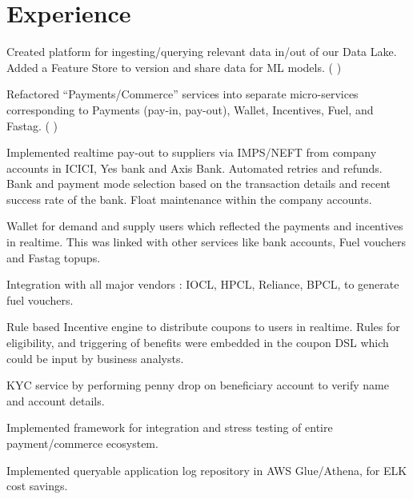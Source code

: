 \documentclass[]{deedy-resume-openfont}
\begin{document}
    
%
%
%
%
\section{Experience}
\hfill {}
\begin{tightemize}
	\item Created platform for ingesting/querying relevant data in/out of our Data Lake. Added a Feature Store to version and share data for ML models.\newline
    (
        {}
    )
	\item Refactored “Payments/Commerce” services into separate micro-services corresponding to Payments (pay-in, pay-out), Wallet, Incentives, Fuel, and Fastag.\newline
    (
        {}
    )
	\item Implemented realtime pay-out to suppliers via IMPS/NEFT from company accounts in ICICI, Yes bank and Axis Bank. Automated retries and refunds. Bank and payment mode selection based on the transaction details and recent success rate of the bank. Float maintenance within the company accounts.
	\item Wallet for demand and supply users which reflected the payments and incentives in realtime. This was linked with other services like bank accounts, Fuel vouchers and Fastag topups.
	\item Integration with all major vendors : IOCL, HPCL, Reliance, BPCL, to generate fuel vouchers.
	\item Rule based Incentive engine to distribute coupons to users in realtime. Rules for eligibility, and triggering of benefits were embedded in the coupon DSL which could be input by business analysts.
	\item KYC service by performing penny drop on beneficiary account to verify name and account details.
	\item Implemented framework for integration and stress testing of entire payment/commerce ecosystem.
	\item Implemented queryable application log repository in AWS Glue/Athena, for ELK cost savings.
\end{tightemize}
\end{document}
